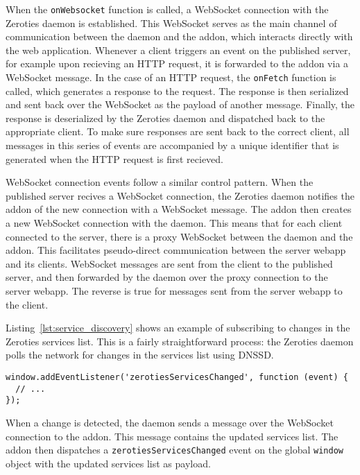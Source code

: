 When the \texttt{onWebsocket} function is called, a WebSocket connection with the Zeroties daemon is established.
This WebSocket serves as the main channel of communication between the daemon and the addon, which interacts directly with the web application.
Whenever a client triggers an event on the published server, for example upon recieving an HTTP request, it is forwarded to the addon via a WebSocket message.
In the case of an HTTP request, the \texttt{onFetch} function is called, which generates a response to the request.
The response is then serialized and sent back over the WebSocket as the payload of another message.
Finally, the response is deserialized by the Zeroties daemon and dispatched back to the appropriate client.
To make sure responses are sent back to the correct client, all messages in this series of events are accompanied by a unique identifier that is generated when the HTTP request is first recieved.

WebSocket connection events follow a similar control pattern.
When the published server recives a WebSocket connection, the Zeroties daemon notifies the addon of the new connection with a WebSocket message.
The addon then creates a new WebSocket connection with the daemon. 
This means that for each client connected to the server, there is a proxy WebSocket between the daemon and the addon.
This facilitates pseudo-direct communication between the server webapp and its clients.
WebSocket messages are sent from the client to the published server, and then forwarded by the daemon over the proxy connection to the server webapp.
The reverse is true for messages sent from the server webapp to the client.

Listing~\ref{lst:service_discovery} shows an example of subscribing to changes in the Zeroties services list.
This is a fairly straightforward process: the Zeroties daemon polls the network for changes in the services list using DNSSD.

\begin{lstlisting}[caption={Service discovery},label={lst:service_discovery}]
window.addEventListener('zerotiesServicesChanged', function (event) {
  // ...
});
\end{lstlisting}

When a change is detected, the daemon sends a message over the WebSocket connection to the addon.
This message contains the updated services list.
The addon then dispatches a \texttt{zerotiesServicesChanged} event on the global \texttt{window} object with the updated services list as payload.
